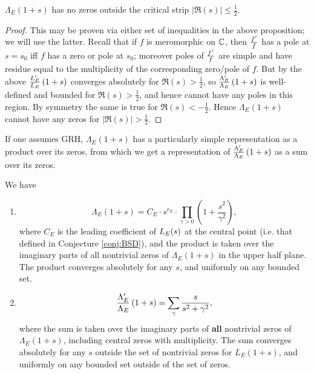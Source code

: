 \begin{corollary}
$\Lambda_E(1+s)$ has no zeros outside the critical strip $|\Re(s)| \le \frac{1}{2}$.
\end{corollary}
\begin{proof}
This may be proven via either set of inequalities in the above proposition; we will use the latter. Recall that if $f$ is meromorphic on $\mathbb{C}$, then $\frac{f^{\prime}}{f}$ has a pole at $s=s_0$ iff $f$ has a zero or pole at $s_0$; moreover poles of $\frac{f^{\prime}}{f}$ are simple and have residue equal to the multiplicity of the corresponding zero/pole of $f$. But by the above $\frac{L_E^{\prime}}{L_E}\left(1+s\right)$ converges absolutely for $\Re(s)>\frac{1}{2}$, so $\frac{\Lambda_E^{\prime}}{\Lambda_E}\left(1+s\right)$ is well-defined and bounded for $\Re(s)>\frac{1}{2}$, and hence cannot have any poles in this region. By symmetry the same is true for $\Re(s)<-\frac{1}{2}$. Hence $\Lambda_E(1+s)$ cannot have any zeros for $|\Re(s)| > \frac{1}{2}$.
\end{proof}

If one assumes GRH, $\Lambda_E(1+s)$ has a particularly simple representation as a product over its zeros, from which we get a representation of $\frac{\Lambda_E^{\prime}}{\Lambda_E}\left(1+s\right)$ as a sum over its zeros.
\begin{proposition}[GRH]
\label{prop:logderiv_zero_rep} We have
\begin{enumerate}
\item \begin{equation}\label{eqn:Lams_prod}
\Lambda_E(1+s) = C_E\cdot s^{r_E} \cdot \prod_{\gamma > 0} \left(1+\frac{s^2}{\gamma^2}\right),
\end{equation}
where $C_E$ is the leading coefficient of $L_E(s)$ at the central point (i.e. that defined in Conjecture \ref{conj:BSD}), and the product is taken over the imaginary parts of all nontrivial zeros of $\Lambda_E(1+s)$ in the upper half plane. The product converges absolutely for any $s$, and uniformly on any bounded set.
\item \begin{equation}\label{eqn:ldLam_sum}
\frac{\Lambda_E^{\prime}}{\Lambda_E}\left(1+s\right) = \sum_{\gamma} \frac{s}{s^2+\gamma^2}, 
\end{equation}
where the sum is taken over the imaginary parts of {\bf all} nontrivial zeros of $\Lambda_E(1+s)$, including central zeros with multiplicity. The sum converges absolutely for any $s$ outside the set of nontrivial zeros for $L_E(1+s)$, and uniformly on any bounded set outside of the set of zeros. \\
\end{enumerate}
\end{proposition}

